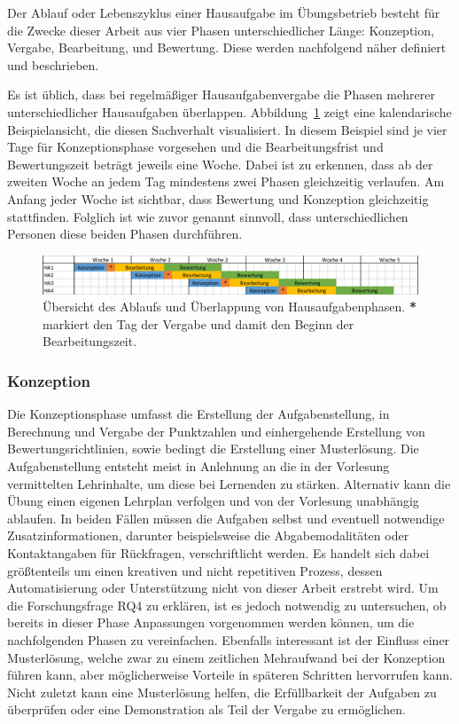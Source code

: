 Der Ablauf oder Lebenszyklus einer Hausaufgabe im Übungsbetrieb besteht für die Zwecke dieser Arbeit aus vier Phasen unterschiedlicher Länge:
Konzeption, Vergabe, Bearbeitung, und Bewertung.
Diese werden nachfolgend näher definiert und beschrieben.

Es ist üblich, dass bei regelmäßiger Hausaufgabenvergabe die Phasen mehrerer unterschiedlicher Hausaufgaben überlappen.
Abbildung~\ref{fig:overlapping-phases} zeigt eine kalendarische Beispielansicht, die diesen Sachverhalt visualisiert.
In diesem Beispiel sind je vier Tage für Konzeptionsphase vorgesehen und die Bearbeitungsfrist und Bewertungszeit beträgt jeweils eine Woche.
Dabei ist zu erkennen, dass ab der zweiten Woche an jedem Tag mindestens zwei Phasen gleichzeitig verlaufen.
Am Anfang jeder Woche ist sichtbar, dass Bewertung und Konzeption gleichzeitig stattfinden.
Folglich ist wie zuvor genannt sinnvoll, dass unterschiedlichen Personen diese beiden Phasen durchführen.

\begin{figure}
    \centering
    \includegraphics[width=\textwidth]{images/ablauf}
    \caption{Übersicht des Ablaufs und Überlappung von Hausaufgabenphasen. \textbf{*} markiert den Tag der Vergabe und damit den Beginn der Bearbeitungszeit.}
    \label{fig:overlapping-phases}
\end{figure}

\subsubsection{Konzeption}

Die Konzeptionsphase umfasst die Erstellung der Aufgabenstellung, in Berechnung und Vergabe der Punktzahlen und einhergehende Erstellung von Bewertungsrichtlinien, sowie bedingt die Erstellung einer Musterlösung.
Die Aufgabenstellung entsteht meist in Anlehnung an die in der Vorlesung vermittelten Lehrinhalte, um diese bei Lernenden zu stärken.
Alternativ kann die Übung einen eigenen Lehrplan verfolgen und von der Vorlesung unabhängig ablaufen.
In beiden Fällen müssen die Aufgaben selbst und eventuell notwendige Zusatzinformationen, darunter beispielsweise die Abgabemodalitäten oder Kontaktangaben für Rückfragen, verschriftlicht werden.
Es handelt sich dabei größtenteils um einen kreativen und nicht repetitiven Prozess, dessen Automatisierung oder Unterstützung nicht von dieser Arbeit erstrebt wird.
Um die Forschungsfrage RQ4 zu erklären, ist es jedoch notwendig zu untersuchen, ob bereits in dieser Phase Anpassungen vorgenommen werden können, um die nachfolgenden Phasen zu vereinfachen.
Ebenfalls interessant ist der Einfluss einer Musterlösung, welche zwar zu einem zeitlichen Mehraufwand bei der Konzeption führen kann, aber möglicherweise Vorteile in späteren Schritten hervorrufen kann.
Nicht zuletzt kann eine Musterlösung helfen, die Erfüllbarkeit der Aufgaben zu überprüfen oder eine Demonstration als Teil der Vergabe zu ermöglichen.

